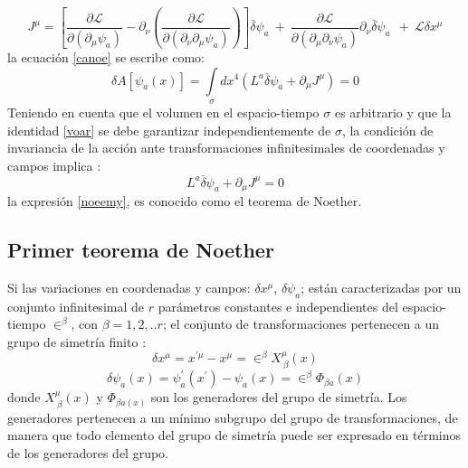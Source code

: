 \documentclass[a4paper,12pt]{article}
\begin{document}
\begin{equation}
J^\mu=\left[\frac{\partial \mathscr{L} }{\partial(\partial_{\mu} \psi_a)}-\partial_{\nu}\left(\frac{\partial\mathscr{L} }{\partial(\partial_{\nu}\partial_{\mu} \psi_a)}  \right) \right]\overset{\_}{\delta}\psi_a\ +\ \frac{\partial\mathscr{L} }{\partial(\partial_{\mu}\partial_{\nu} \psi_a)}\partial_{\nu}\overset{\_}{\delta} \psi_a\ \ + \ \mathscr{L}\delta x^\mu
\label{corr}
\end{equation}
la ecuación \eqref{canoe} se escribe como:
\begin{equation}
\delta A[\psi_a (x)]=\int\limits_{\sigma}dx^{4}\left(L^a\overset{\_}{\delta}\psi_a+\partial_\mu J^\mu \right)=0 
\label{voar}
\end{equation}
Teniendo en cuenta que el volumen en el espacio-tiempo $\sigma$ es arbitrario y que la identidad \eqref{voar} se debe garantizar independientemente de $\sigma$, la condición de invariancia de la acción ante transformaciones infinitesimales de coordenadas y campos implica \cite{noether,general,greiner}:
\begin{equation}
L^a\overset{\_}{\delta}\psi_a+\partial_\mu J^\mu=0 
\label{noeemy}
\end{equation}
la expresión \eqref{noeemy}, es conocido como el teorema de Noether. 
\subsection{Primer teorema de Noether}
Si las variaciones en coordenadas y campos: $\delta x^{\mu}$, $\delta\psi_a$; están caracterizadas por un conjunto infinitesimal de $r$ parámetros constantes e independientes del \mbox{espacio-tiempo} $\in^\beta $, con $\beta=1,2,..r$; el conjunto de transformaciones pertenecen a un grupo de simetría finito \cite{ noether, greiner, emmy}: 
\begin{equation}
\delta x^{\mu}=x^{'\mu}-x^{\mu}=\in^\beta X_{\ \beta}^\mu(x)
\label{glocon}
\end{equation}
$$\delta\psi_a(x)=\psi_a^{'}(x^{'})-\psi_a(x)=\in^\beta \Phi_{\beta a}(x)$$
donde $X_{\ \beta}^\mu(x)$ y $\Phi_{\beta a(x)}$ son los generadores del grupo de simetría. Los generadores pertenecen a un mínimo subgrupo del grupo de transformaciones, de manera que todo elemento del grupo de simetría puede ser expresado en términos de los generadores del grupo.
\\
\end{document}
